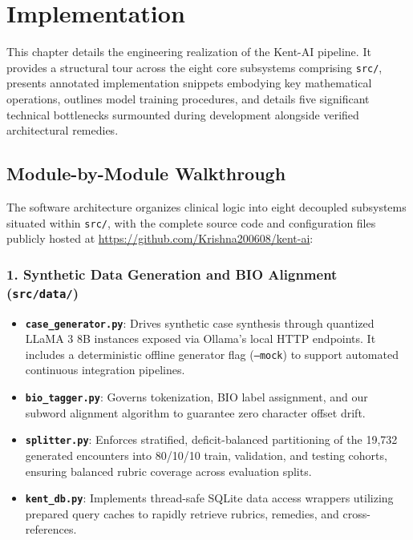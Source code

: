 
\chapter{Implementation}
\label{Chapter5}

This chapter details the engineering realization of the Kent-AI pipeline. It provides a structural tour across the eight core subsystems comprising \texttt{src/}, presents annotated implementation snippets embodying key mathematical operations, outlines model training procedures, and details five significant technical bottlenecks surmounted during development alongside verified architectural remedies.


\section{Module-by-Module Walkthrough}

The software architecture organizes clinical logic into eight decoupled subsystems situated within \texttt{src/}, with the complete source code and configuration files publicly hosted at \url{https://github.com/Krishna200608/kent-ai}:

\subsection{1. Synthetic Data Generation and BIO Alignment (\texttt{src/data/})}
\begin{itemize}
  \item \textbf{\texttt{case\_generator.py}}: Drives synthetic case synthesis through quantized LLaMA 3 8B instances exposed via Ollama's local HTTP endpoints. It includes a deterministic offline generator flag (\texttt{--mock}) to support automated continuous integration pipelines.
  \item \textbf{\texttt{bio\_tagger.py}}: Governs tokenization, BIO label assignment, and our subword alignment algorithm to guarantee zero character offset drift.
  \item \textbf{\texttt{splitter.py}}: Enforces stratified, deficit-balanced partitioning of the 19,732 generated encounters into 80/10/10 train, validation, and testing cohorts, ensuring balanced rubric coverage across evaluation splits.
  \item \textbf{\texttt{kent\_db.py}}: Implements thread-safe SQLite data access wrappers utilizing prepared query caches to rapidly retrieve rubrics, remedies, and cross-references.
\end{itemize}

